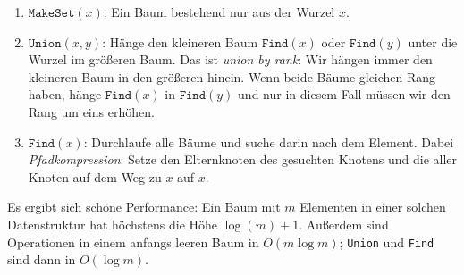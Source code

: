 \documentclass[11pt]{scrartcl}
\begin{document}
\begin{enumerate}
\item $\texttt{MakeSet}(x)$: Ein Baum bestehend nur aus der Wurzel $x$.
\item $\texttt{Union}(x,y)$: Hänge den kleineren Baum $\texttt{Find}(x)$ oder $\texttt{Find}(y)$ unter die Wurzel im größeren Baum. Das ist \textit{union by rank}: Wir hängen immer den kleineren Baum in den größeren hinein. Wenn beide Bäume gleichen Rang haben, hänge $\texttt{Find}(x)$ in $\texttt{Find}(y)$ und nur in diesem Fall müssen wir den Rang um eins erhöhen.
\item $\texttt{Find}(x)$: Durchlaufe alle Bäume und suche darin nach dem Element. Dabei \textit{Pfadkompression}: Setze den Elternknoten des gesuchten Knotens und die aller Knoten auf dem Weg zu $x$ auf $x$.
\end{enumerate}

Es ergibt sich schöne Performance: Ein Baum mit $m$ Elementen in einer solchen Datenstruktur hat höchstens die Höhe $\log(m) + 1$. Außerdem sind Operationen in einem anfangs leeren Baum in $O(m \log m)$; \texttt{Union} und \texttt{Find} sind dann in $O(\log m)$.
\end{document}
